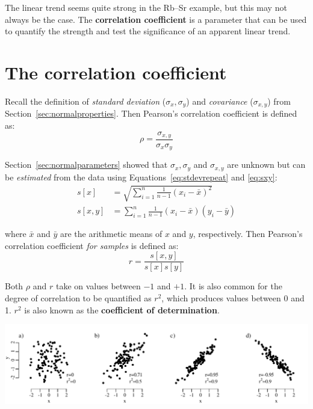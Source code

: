 The linear trend seems quite strong in the Rb--Sr example, but this
may not always be the case. The \textbf{correlation coefficient} is a
parameter that can be used to quantify the strength and test the
significance of an apparent linear trend.

\section{The correlation coefficient}
\label{sec:corrcoef}

Recall the definition of \emph{standard deviation} ($\sigma_x,
\sigma_y$) and \emph{covariance} ($\sigma_{x,y}$) from
Section~\ref{sec:normalproperties}. Then Pearson's correlation
coefficient is defined as:
\begin{equation}
  \rho = \frac{\sigma_{x,y}}{\sigma_x\sigma_y}
  \label{eq:rho}
\end{equation}

Section~\ref{sec:normalparameters} showed that $\sigma_x, \sigma_y$
and $\sigma_{x,y}$ are unknown but can be \emph{estimated} from the
data using Equations~\ref{eq:stdevrepeat} and \ref{eq:sxy}:
\begin{equation*}
  \begin{split}
  s[x] & = \sqrt{\sum\limits_{i=1}^{n}\frac{1}{n-1}(x_i-\bar{x})^2} \\
  s[x,y] & = \sum\limits_{i=1}^{n}\frac{1}{n-1}(x_i-\bar{x})(y_i-\bar{y})
  \end{split}
\end{equation*}

\noindent where $\bar{x}$ and $\bar{y}$ are the arithmetic means of
$x$ and $y$, respectively. Then Pearson's correlation coefficient
\emph{for samples} is defined as:
\begin{equation}
  r = \frac{s[x,y]}{s[x]s[y]}
  \label{eq:r}
\end{equation}

Both $\rho$ and $r$ take on values between $-1$ and $+1$. It is also
common for the degree of correlation to be quantified as $r^2$, which
produces values between 0 and 1. $r^2$ is also known as the
\textbf{coefficient of determination}.

\noindent\includegraphics[width=\textwidth]{../figures/r.pdf} \begingroup
{}
\label{fig:r}
\endgroup

